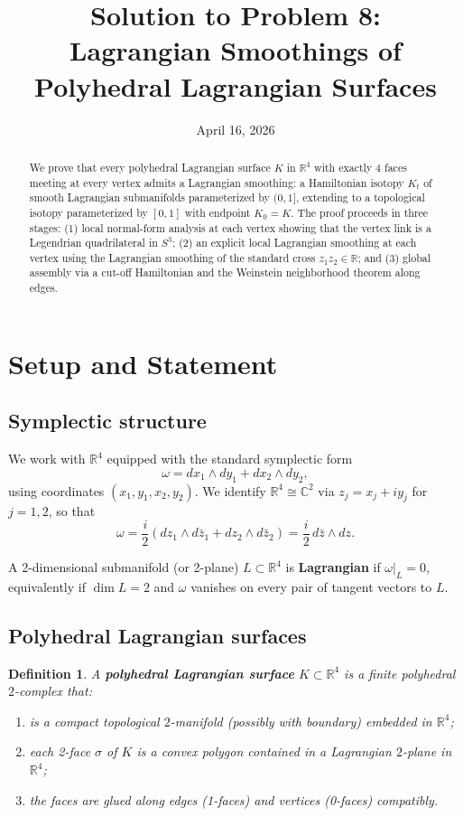 \documentclass[12pt]{article}
\title{Solution to Problem 8:\\
Lagrangian Smoothings of Polyhedral Lagrangian Surfaces}
\author{}
\date{April 16, 2026}
\newtheorem{definition}[theorem]{Definition}
\newcommand{\bR}{\mathbb{R}}
\newcommand{\bC}{\mathbb{C}}
\newcommand{\om}{\omega}
\begin{document}
\maketitle

\begin{abstract}
We prove that every polyhedral Lagrangian surface $K$ in $\bR^4$ with exactly 4 faces meeting at every vertex admits a Lagrangian smoothing: a Hamiltonian isotopy $K_t$ of smooth Lagrangian submanifolds parameterized by $(0,1]$, extending to a topological isotopy parameterized by $[0,1]$ with endpoint $K_0 = K$. The proof proceeds in three stages: (1) local normal-form analysis at each vertex showing that the vertex link is a Legendrian quadrilateral in $S^3$; (2) an explicit local Lagrangian smoothing at each vertex using the Lagrangian smoothing of the standard cross $z_1 z_2 \in \bR$; and (3) global assembly via a cut-off Hamiltonian and the Weinstein neighborhood theorem along edges.
\end{abstract}

\tableofcontents

\section{Setup and Statement}

\subsection{Symplectic structure}

We work with $\bR^4$ equipped with the standard symplectic form
\[
  \om = dx_1 \wedge dy_1 + dx_2 \wedge dy_2,
\]
using coordinates $(x_1, y_1, x_2, y_2)$. We identify $\bR^4 \cong \bC^2$ via $z_j = x_j + iy_j$ for $j = 1,2$, so that
\[
  \om = \frac{i}{2}(dz_1 \wedge d\bar{z}_1 + dz_2 \wedge d\bar{z}_2) = \frac{i}{2}\,d\bar{z} \wedge dz.
\]

A 2-dimensional submanifold (or 2-plane) $L \subset \bR^4$ is \textbf{Lagrangian} if $\om|_L = 0$, equivalently if $\dim L = 2$ and $\om$ vanishes on every pair of tangent vectors to $L$.

\subsection{Polyhedral Lagrangian surfaces}

\begin{definition}
A \textbf{polyhedral Lagrangian surface} $K \subset \bR^4$ is a finite polyhedral $2$-complex that:
\begin{enumerate}[label=(\roman*)]
  \item is a compact topological $2$-manifold (possibly with boundary) embedded in $\bR^4$;
  \item each 2-face $\sigma$ of $K$ is a convex polygon contained in a Lagrangian $2$-plane in $\bR^4$;
  \item the faces are glued along edges (1-faces) and vertices (0-faces) compatibly.
\end{enumerate}
\end{definition}
\end{document}
